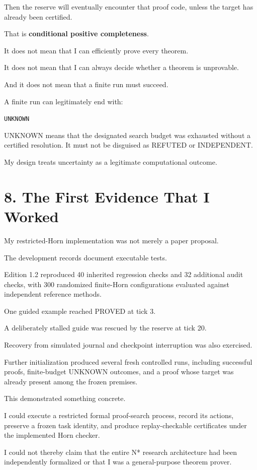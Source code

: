 \documentclass[11pt,letterpaper]{article}
\begin{document}
Then the reserve will eventually encounter that proof code, unless the target has already been certified.

That is \textbf{conditional positive completeness}.

It does not mean that I can efficiently prove every theorem.

It does not mean that I can always decide whether a theorem is unprovable.

And it does not mean that a finite run must succeed.

A finite run can legitimately end with:

\texttt{UNKNOWN}

UNKNOWN means that the designated search budget was exhausted without a certified resolution. It must not be disguised as REFUTED or INDEPENDENT.

My design treats uncertainty as a legitimate computational outcome.

\section{8. The First Evidence That I Worked}\label{the-first-evidence-that-i-worked}

My restricted-Horn implementation was not merely a paper proposal.

The development records document executable tests.

Edition 1.2 reproduced 40 inherited regression checks and 32 additional audit checks, with 300 randomized finite-Horn configurations evaluated against independent reference methods.

One guided example reached PROVED at tick 3.

A deliberately stalled guide was rescued by the reserve at tick 20.

Recovery from simulated journal and checkpoint interruption was also exercised.

Further initialization produced several fresh controlled runs, including successful proofs, finite-budget UNKNOWN outcomes, and a proof whose target was already present among the frozen premises.

This demonstrated something concrete.

I could execute a restricted formal proof-search process, record its actions, preserve a frozen task identity, and produce replay-checkable certificates under the implemented Horn checker.

I could not thereby claim that the entire N* research architecture had been independently formalized or that I was a general-purpose theorem prover.
\end{document}
